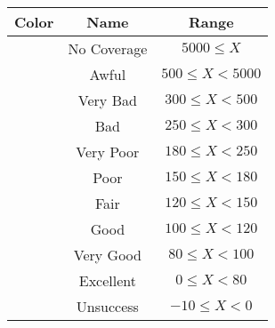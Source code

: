 \begin{tabular}{|c|c|c|}\hline
\rowcolor{Plum!20}
Color&Name&Range\\\hline\hline
\cellcolor[HTML]{aaaaaa} &No Coverage&$5000\leq X$\\\hline
\cellcolor[HTML]{820000} &Awful&$500\leq X<5000$\\\hline
\cellcolor[HTML]{dc143c} &Very Bad&$300\leq X<500$\\\hline
\cellcolor[HTML]{ff0000} &Bad&$250\leq X<300$\\\hline
\cellcolor[HTML]{fa6400} &Very Poor&$180\leq X<250$\\\hline
\cellcolor[HTML]{ffaa00} &Poor&$150\leq X<180$\\\hline
\cellcolor[HTML]{ffff00} &Fair&$120\leq X<150$\\\hline
\cellcolor[HTML]{00d228} &Good&$100\leq X<120$\\\hline
\cellcolor[HTML]{00a032} &Very Good&$80\leq X<100$\\\hline
\cellcolor[HTML]{00703c} &Excellent&$0\leq X<80$\\\hline
\cellcolor[HTML]{1e90ff} &Unsuccess&$-10\leq X<0$\\\hline
\end{tabular}
